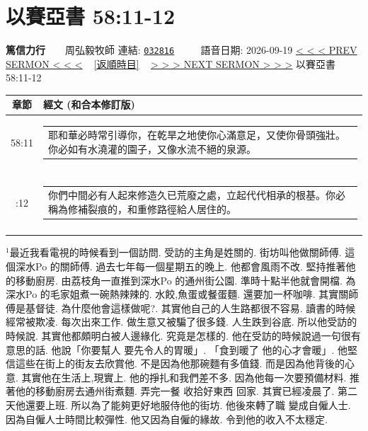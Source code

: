 \documentclass{book}
\begin{document}
\section{以賽亞書 58:11-12}
\label{sec:032816}
\textbf{篤信力行}~~~~周弘毅牧師
\newline
\newline
連結: \href{http://www.church.com.hk/acms/content.asp?site=cdc\&op=show\&type=product\&code=032816\&layout=sermon}{\texttt{032816}} ~~~~ 語音日期: 2026-09-19
\newline
\newline
\hyperref[sec:032815]{\small{< < < PREV SERMON < < <}}
~
\hyperref[sec:index_chronic]{\small{[返順時目]}}
~
\hyperref[sec:032817]{\small{> > > NEXT SERMON > > >}}
\newline
\newline
以賽亞書 58:11-12
\newline
\begin{longtable}{cl}
\hline
\hline
章節 & 經文 (和合本修訂版)\\
\hline
58:11 & \begin{tabularx}{0.7\textwidth}{X} 耶和華必時常引導你，在乾旱之地使你心滿意足，又使你骨頭強壯。你必如有水澆灌的園子，又像水流不絕的泉源。 \end{tabularx} \\ \\ \relax
58:12 & \begin{tabularx}{0.7\textwidth}{X} 你們中間必有人起來修造久已荒廢之處，立起代代相承的根基。你必稱為修補裂痕的，和重修路徑給人居住的。 \end{tabularx} \\ \\
[1ex]
\hline
\hline
\end{longtable}
$^{1}$最近我看電視的時候看到一個訪問.
受訪的主角是姓關的.
街坊叫他做關師傅.
這個深水Po 的關師傅.
過去七年每一個星期五的晚上.
他都會風雨不改.
堅持推著他的移動廚房.
由荔枝角一直推到深水Po 的通州街公園.
準時十點半他就會開檔.
為深水Po 的毛家姐煮一碗熱辣辣的.
水餃,魚蛋或餐蛋麵.
還要加一杯咖啡.
其實關師傅是基督徒.
為什麼他會這樣做呢?.
其實他自己的人生路都很不容易.
讀書的時候經常被欺凌.
每次出來工作.
做生意又被騙了很多錢.
人生跌到谷底.
所以他受訪的時候說.
其實他都頗明白被人邊緣化.
究竟是怎樣的.
他在受訪的時候說過一句很有意思的話.
他說「你要幫人 要先令人的胃暖」.
「食到暖了 他的心才會暖」.
他堅信這些在街上的街友去欣賞他.
不是因為他那碗麵有多值錢.
而是因為他背後的心意.
其實他在生活上,現實上.
他的掙扎和我們差不多.
因為他每一次要預備材料.
推著他的移動廚房去通州街煮麵.
弄完一餐 收拾好東西 回家.
其實已經凌晨了.
第二天他還要上班.
所以為了能夠更好地服侍他的街坊.
他後來轉了職 變成自僱人士.
因為自僱人士時間比較彈性.
他又因為自僱的緣故.
令到他的收入不太穩定.
\end{document}
